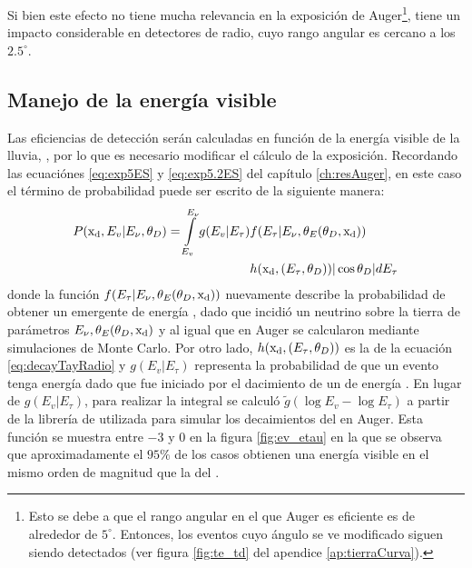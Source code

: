 	Si bien este efecto no tiene mucha relevancia en la exposici\'on de Auger\footnote{Esto se debe a que el rango angular en el que Auger es eficiente es de alrededor de $5^\circ$. Entonces, los eventos cuyo \'angulo se ve modificado siguen siendo detectados (ver figura \ref{fig:te_td} del apendice \ref{ap:tierraCurva}).}, tiene un impacto considerable en detectores de radio, cuyo rango angular es cercano a los $2.5^\circ$.
	
	\subsection{Manejo de la energ\'ia visible}
	Las eficiencias de detecci\'on ser\'an calculadas en funci\'on de la energ\'ia visible de la lluvia, \ev{}, por lo que es necesario modificar el c\'alculo de la exposici\'on.
	Recordando las ecuaci\'ones \ref{eq:exp5ES} y \ref{eq:exp5.2ES} del cap\'itulo \ref{ch:resAuger}, en este caso el t\'ermino de probabilidad puede ser escrito de la siguiente manera:
	\begin{equation}
		\begin{aligned}
		P({\rm x_d},E_v|E_{\nu},\theta_D)=
		\int\limits_{E_v}^{E_\nu}
		g(E_v|E_\tau)
		& f(E_\tau|E_\nu,\theta_E(\theta_D,{\rm x_d}))\\
		&h({\rm x_d},(E_\tau,\theta_D))
		|\cos\theta_D|
		dE_\tau
		\end{aligned}
	\end{equation}
	donde la funci\'on $f(E_\tau|E_\nu,\theta_E(\theta_D,{\rm x_d}))$ nuevamente describe la probabilidad de obtener un \tauon{} emergente de energ\'ia \etau{}, dado que incidi\'o un neutrino sobre la tierra de par\'ametros $E_\nu,\theta_E(\theta_D,{\rm x_d})$ y al igual que en Auger se calcularon mediante simulaciones de Monte Carlo.
	Por otro lado, $h({\rm x_d},(E_\tau,\theta_D))$ es la de la ecuaci\'on \ref{eq:decayTayRadio} y $g(E_v|E_\tau)$ representa la probabilidad de que un evento tenga energ\'ia \ev{} dado que fue iniciado por el dacimiento de un \tauon{} de energ\'ia \etau{}.
	En lugar de $g(E_v|E_\tau)$, para realizar la integral se calcul\'o $\tilde{g}(\log E_v-\log E_\tau)$ a partir de la librer\'ia de \tauola{} utilizada para simular los decaimientos del \tauon{} en Auger.
	Esta funci\'on se muestra entre $-3$ y $0$ en la figura \ref{fig:ev_etau} en la que se observa que aproximadamente el $95\%$ de los casos obtienen una energ\'ia visible en el mismo orden de magnitud que la del \tauon{}.
